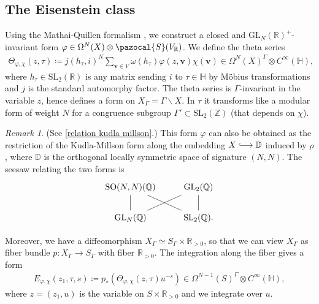 \documentclass[a4paper,11pt]{amsart} %
\newcommand{\8}{\infty}
\newcommand{\Z}{\mathbb{Z}}
\newcommand{\vbf}{\mathbf{v}}
\newcommand{\SO}{\mathrm{SO}}
\newcommand{\SL}{\mathrm{SL}}
\newcommand{\GL}{\mathrm{GL}}
\newcommand{\D}{\mathbb{D}}
\newcommand{\HH}{\mathbb{H}}
\newcommand{\R}{\mathbb{R}}
\newcommand{\Q}{\mathbb{Q}}
\newcommand{\Scal}{\pazocal{S}}
\newcommand{\hooklongrightarrow}{\lhook\joinrel\longrightarrow}
\theoremstyle{mytheoremstyle}
\theoremstyle{remark}
\newtheorem{rmk}{Remark}[section]
\numberwithin{equation}{section}
\begin{document}
\subsection{The Eisenstein class} Using the Mathai-Quillen formalism \cite{mq}, we construct a closed and $\GL_N(\R)^+$-invariant form $\varphi \in \Omega^N(X) \otimes \Scal(V_\R)$. We define the theta series
\begin{align}
\Theta_{\varphi, \chi}(z,\tau) \coloneqq j(h_\tau,i)^N  \sum_{\vbf \in V} \omega(h_\tau) \varphi(z,\vbf)\chi(\vbf) \in \Omega^N(X)^{\Gamma} \otimes C^\8(\HH),
\end{align}
where $h_\tau \in \SL_2(\R)$ is any matrix sending $i$ to $\tau \in \HH$ by Möbius transformations and $j$ is the standard automorphy factor. The theta series is $\Gamma$-invariant in the variable $z$, hence defines a form on $X_{\Gamma}=\Gamma \backslash X$. In $\tau$ it transforms like a modular form of weight $N$ for a congruence subgroup $\Gamma' \subset \SL_2(\Z)$ (that depends on $\chi$). 

\begin{rmk}(See \ref{relation kudla millson}.) This form $\varphi$ can also be obtained as the restriction of the Kudla-Millson form along the embedding $X \hooklongrightarrow \D$ induced by $\rho$, where $\D$ is the orthogonal locally symmetric space of signature $(N,N)$. The seesaw relating the two forms is
\[
\begin{tikzcd}
\SO(N,N)(\Q) \arrow[dash, dr] & \GL_2(\Q) \\
\GL_N(\Q) \arrow[dash]{u} \arrow[dash, ru] &\SL_2(\Q). \arrow[dash]{u}
\end{tikzcd}
\]

\end{rmk}

 Moreover, we have a diffeomorphism $X_\Gamma \simeq S_\Gamma \times \R_{>0}$, so that we can view $X_\Gamma$ as fiber bundle $p \colon X_\Gamma \longrightarrow S_\Gamma$ with fiber $\R_{>0}$. The integration along the fiber gives a form
\begin{align} \label{integral112}
E_{\varphi, \chi}(z_1,\tau,s) \coloneqq p_\ast \left ( \Theta_{\varphi, \chi}(z,\tau)u^{-s} \right )\in \Omega^{N-1}(S)^{\Gamma} \otimes C^\8(\HH),
\end{align}
where $z=(z_1,u)$ is the variable on $S \times \R_{>0}$ and we integrate over $u$. 
\end{document}
